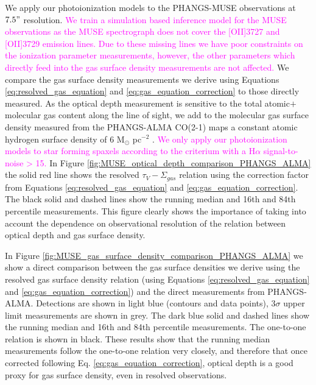 \documentclass[fleqn,usenatbib]{mnras}
\begin{document}
We apply our photoionization models to the PHANGS-MUSE observations at $7.5"$ resolution. \textcolor{magenta}{We train a simulation based inference model for the MUSE observations as the MUSE spectrograph does not cover the [OII]3727 and [OII]3729 emission lines. Due to these missing lines we have poor constraints on the ionization parameter measurements, however, the other parameters which directly feed into the gas surface density measurements are not affected.} We compare the gas surface density measurements we derive using Equations \ref{eq:resolved_gas_equation} and \ref{eq:gas_equation_correction} to those directly measured. As the optical depth measurement is sensitive to the total atomic$+$molecular gas content along the line of sight, we add to the molecular gas surface density measured from the PHANGS-ALMA CO(2-1) maps \citep{leroy2021} a constant atomic hydrogen surface density of 6 M$_{\odot}$ pc$^{-2}$ \citep{barrera-ballesteros2020}. \textcolor{magenta}{We only apply our photoionization models to star forming spaxels according to the \cite{kauffmann2003} criterium with a H$\alpha$ signal-to-noise > 15.} In Figure \ref{fig:MUSE_optical_depth_comparison_PHANGS_ALMA} the solid red line shows the resolved $\tau_V-\Sigma_{gas}$ relation using the correction factor from Equations \ref{eq:resolved_gas_equation} and \ref{eq:gas_equation_correction}. The black solid and dashed lines show the running median and 16th and 84th percentile measurements. This figure clearly shows the importance of taking into account the dependence on observational resolution of the relation between optical depth and gas surface density. 

In Figure \ref{fig:MUSE_gas_surface_density_comparison_PHANGS_ALMA} we show a direct comparison between the gas surface densities we derive using the resolved gas surface density relation (using Equations \ref{eq:resolved_gas_equation} and \ref{eq:gas_equation_correction}) and the direct measurements from PHANGS-ALMA. Detections are shown in light blue (contours and data points), 3$\sigma$ upper limit measurements are shown in grey. The dark blue solid and dashed lines show the running median and 16th and 84th percentile measurements. The one-to-one relation is shown in black. These results show that the running median measurements follow the one-to-one relation very closely, and therefore that once corrected following Eq. \ref{eq:gas_equation_correction}, optical depth is a good proxy for gas surface density, even in resolved observations. 
\end{document}
